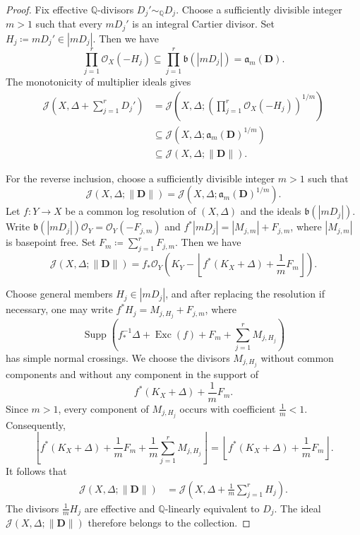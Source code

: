 \documentclass[a4paper,12pt]{amsart}
\theoremstyle{plain}
\theoremstyle{definition}
\numberwithin{equation}{section}
\def\Supp{\operatorname{Supp}}
\def\Exc{\operatorname{Exc}}
\begin{document}
\begin{proof}
Fix effective $\mathbb Q$-divisors $D_j'\sim_{\mathbb Q}D_j$. Choose a sufficiently divisible integer $m>1$ such that every $mD_j'$ is an integral Cartier divisor. Set $H_j\coloneqq mD_j'\in |mD_j|$. Then we have 
\[
\prod_{j=1}^r\mathcal O_X(-H_j)\subseteq \prod_{j=1}^r\mathfrak b(|mD_j|) = \mathfrak a_m(\mathbf D).
\]
The monotonicity of multiplier ideals gives
\begin{align*}
\mathcal J\left(X,\Delta+\sum_{j=1}^rD_j'\right)
&=
\mathcal J\left(X,\Delta;\left(\prod_{j=1}^r\mathcal O_X(-H_j)\right)^{1/m}\right)\\
&\subseteq
\mathcal J\left(X,\Delta;\mathfrak a_m(\mathbf D)^{1/m}\right)\\
&\subseteq
\mathcal J(X,\Delta;\|\mathbf D\|).
\end{align*}

For the reverse inclusion, choose a sufficiently divisible integer
$m>1$ such that
\[
\mathcal J(X,\Delta;\|\mathbf D\|) = \mathcal J\left(X,\Delta;\mathfrak a_m(\mathbf D)^{1/m}\right).
\]
Let \(f\colon Y\to X\) be a common log resolution of $(X,\Delta)$ and the ideals $\mathfrak b(|mD_j|)$. Write \(\mathfrak b(|mD_j|)\mathcal O_Y = \mathcal O_Y(-F_{j,m})\) and \(f^*|mD_j| = |M_{j,m}|+F_{j,m}\), where $|M_{j,m}|$ is basepoint free. Set $F_m\coloneqq\sum_{j=1}^rF_{j,m}$. Then we have
\[
\mathcal J(X,\Delta;\|\mathbf D\|)
= f_*\mathcal O_Y\left(K_Y-\left\lfloor f^*(K_X+\Delta)+\frac{1}{m}F_m\right\rfloor\right).
\]

Choose general members $H_j\in |mD_j|$, and after replacing the resolution if necessary, one may write \(f^*H_j=M_{j,H_j}+F_{j,m}\), where
\[
\Supp\left(f_*^{-1}\Delta+\Exc(f)+F_m+\sum_{j=1}^rM_{j,H_j}\right)
\]
has simple normal crossings. We choose the divisors $M_{j,H_j}$ without common components and without any component in the support of
\[
f^*(K_X+\Delta)+\frac{1}{m}F_m.
\]
Since $m>1$, every component of $M_{j,H_j}$ occurs with coefficient
$\frac{1}{m}<1$. Consequently,
\[
\left\lfloor
f^*(K_X+\Delta)
+\frac{1}{m}F_m
+\frac{1}{m}\sum_{j=1}^rM_{j,H_j}
\right\rfloor
=
\left\lfloor
f^*(K_X+\Delta)+\frac{1}{m}F_m
\right\rfloor.
\]
It follows that
\begin{align*}
\mathcal J(X,\Delta;\|\mathbf D\|)
&=
\mathcal J\left(X,\Delta+\frac{1}{m}\sum_{j=1}^rH_j\right).
\end{align*}
The divisors $\frac{1}{m}H_j$ are effective and $\mathbb Q$-linearly equivalent to $D_j$. The ideal $\mathcal J(X,\Delta;\|\mathbf D\|)$ therefore belongs to the collection.
\end{proof}
\end{document}
